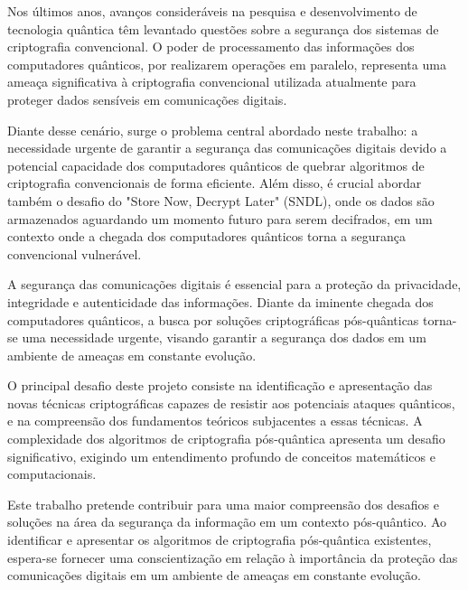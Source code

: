 {\color{cyan}
Nos últimos anos, avanços consideráveis na pesquisa e desenvolvimento de tecnologia quântica têm levantado questões sobre a segurança dos sistemas de criptografia convencional. O poder de processamento das informações dos computadores quânticos, por realizarem operações em paralelo, representa uma ameaça significativa à criptografia convencional utilizada atualmente para proteger dados sensíveis em comunicações digitais.

Diante desse cenário, surge o problema central abordado neste trabalho: a necessidade urgente de garantir a segurança das comunicações digitais devido a potencial capacidade dos computadores quânticos de quebrar algoritmos de criptografia convencionais de forma eficiente. Além disso, é crucial abordar também o desafio do "Store Now, Decrypt Later" (SNDL), onde os dados são armazenados aguardando um momento futuro para serem decifrados, em um contexto onde a chegada dos computadores quânticos torna a segurança convencional vulnerável.

A segurança das comunicações digitais é essencial para a proteção da privacidade, integridade e autenticidade das informações. Diante da iminente chegada dos computadores quânticos, a busca por soluções criptográficas pós-quânticas torna-se uma necessidade urgente, visando garantir a segurança dos dados em um ambiente de ameaças em constante evolução.

O principal desafio deste projeto consiste na identificação e apresentação das novas técnicas criptográficas capazes de resistir aos potenciais ataques quânticos, e na compreensão dos fundamentos teóricos subjacentes a essas técnicas. A complexidade dos algoritmos de criptografia pós-quântica apresenta um desafio significativo, exigindo um entendimento profundo de conceitos matemáticos e computacionais.

Este trabalho pretende contribuir para uma maior compreensão dos desafios e soluções na área da segurança da informação em um contexto pós-quântico. Ao identificar e apresentar os algoritmos de criptografia pós-quântica existentes, espera-se fornecer uma conscientização em relação à importância da proteção das comunicações digitais em um ambiente de ameaças em constante evolução.
}

